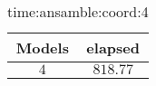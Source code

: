 \begin{table}[!ht]
	\centering
	\begin{tabular}{|c|c|}
		\hline
		Models & elapsed \\ \hline
		$4$ & $818.77$ \\ \hline
	\end{tabular}
	\caption{time:ansamble:coord:4}
	\label{tab:time:ansamble:coord:4}
\end{table}
